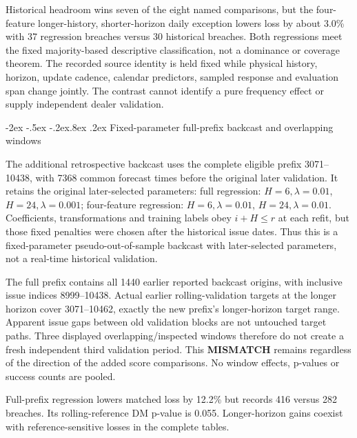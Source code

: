 \documentclass[10pt,a4paper]{article}
\makeatletter
\renewcommand\section{\@startsection{section}{1}{\z@}%
  {-2ex \@plus -.5ex \@minus -.2ex}{.8ex \@plus .2ex}%
  {\normalfont\large\bfseries}}
\makeatother
\begin{document}
Historical headroom wins seven of the eight named comparisons, but the
four-feature longer-history, shorter-horizon daily exception lowers loss by
about 3.0\% with 37 regression breaches versus 30 historical breaches.
Both regressions meet the fixed majority-based descriptive classification,
not a dominance or coverage theorem. The recorded source identity is held fixed while physical history, horizon, update cadence, calendar predictors, sampled response and evaluation span change jointly. The contrast cannot
identify a pure frequency effect or supply independent dealer validation.


\section{Fixed-parameter full-prefix backcast and overlapping windows}\label{sup:v8-backcast}

The additional retrospective backcast uses the complete eligible prefix
3071--10438, with 7368 common forecast times before the original later
validation. It retains the original later-selected parameters: full regression: \(H=6,\lambda=0.01\), \(H=24,\lambda=0.001\); four-feature regression: \(H=6,\lambda=0.01\), \(H=24,\lambda=0.01\).
Coefficients, transformations and training labels obey \(i+H\le r\) at each
refit, but those fixed penalties were chosen after the historical issue dates.
Thus this is a fixed-parameter pseudo-out-of-sample backcast with later-selected
parameters, not a real-time historical validation.

The full prefix contains all 1440 earlier reported backcast origins,
with inclusive issue indices 8999--10438.
Actual earlier rolling-validation targets at the longer horizon cover 3071--10462,
exactly the new prefix's longer-horizon target range. Apparent issue gaps between old validation blocks
are not untouched target paths. Three displayed overlapping/inspected windows
therefore do not create a fresh independent third validation period. This
\textbf{MISMATCH} remains regardless of the direction of the added score
comparisons. No window effects, p-values or success counts are pooled.

Full-prefix regression lowers matched loss by 12.2\% but records 416 versus 282 breaches. Its rolling-reference DM p-value is 0.055. Longer-horizon gains coexist with reference-sensitive losses in the complete tables.
\end{document}
